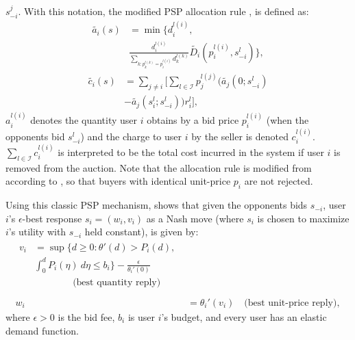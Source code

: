\documentclass[12pt]{article}
\theoremstyle{definition}
\newcommand{\mcI}{\mathcal{I}}
\begin{document}
\begin{multicols}{2}
$s_{−i}^j$. With this notation, the modified PSP allocation rule \cite{tuffin},
\cite{qpsp} is defined
as:
\begin{align*}
    \tilde{a_i}(s) &= \min\big\lbrace d_i^{l(i)}, \\
 &\frac{d_i^{l(i)}}{\sum_{k:p_k^{l(k)}=p_i^{l(i)}}d_k^{l(k)}} \tilde{D_i}(p_i^{l(i)},
s_{-i}^l)\big\rbrace,
\end{align*}
\begin{align*}
    \tilde{c_i}(s) &= \displaystyle\sum_{j\ne i}\bigg\lbrack\sum_{l\in\mcI}
p_j^{l(j)} \bigg(\tilde{a_j}(0; s_{-i}^l)\\
    &-\tilde{a_j}(s_i^l;s_{-i}^l)\bigg) r_i^l\bigg\rbrack,
\end{align*}
 $a_i^{l(i)}$ denotes the quantity user $i$ obtains by a bid price
$p_i^{l(i)}$ (when the
opponents bid $s_{−i}^l$) and the charge to user $i$ by the seller is denoted
$c_i^{l(i)}$. $\sum_{l\in\mcI} c_i^{l(i)}$ is interpreted to be the total cost incurred in the system if
user $i$ is removed from the auction. Note that the allocation rule is modified
from \cite{lazar} according to \cite{tuffin}, so that buyers with identical unit-price
$p_i$ are not rejected.
\iffalse
An allocation rule is feasible \cite{lazar} if $\forall \ s$,
$$
    \displaystyle\sum_{i\in\mcI} a_i(s) \le Q
$$
and $\forall \ i\in\mcI$,
\begin{align*}
    a_i(s) &\le d_i \\
    c_i(s) &\le p_id_i.
\end{align*}
\fi

Using this classic PSP mechanism, \cite{lazar} shows that given the opponents bids $s_{-i}$,
user $i$'s $\epsilon$-best response $s_i = (w_i, v_i)$ as a Nash move
(where $s_i$ is chosen to maximize $i$'s utility with $s_{-i}$ held constant), is
given by:
\begin{align}
\begin{split}
    v_i &= \sup\bigg\lbrace d \ge 0 : \theta '(d) > P_i(d), \\ 
&\displaystyle\int_0^d P_i(\eta) \ d\eta \le b_i\bigg\rbrace -
\frac{\epsilon}{\theta_i'(0)} \\
&\qquad\qquad \text{(best quantity reply)} \\
\end{split}\\
    w_i &= \theta_i'(v_i) \quad \text{(best unit-price reply)},
\end{align}
where $\epsilon > 0$ is the bid fee, $b_i$ is user $i$'s budget, and every user
has an elastic demand function.


\end{multicols}
\end{document}
